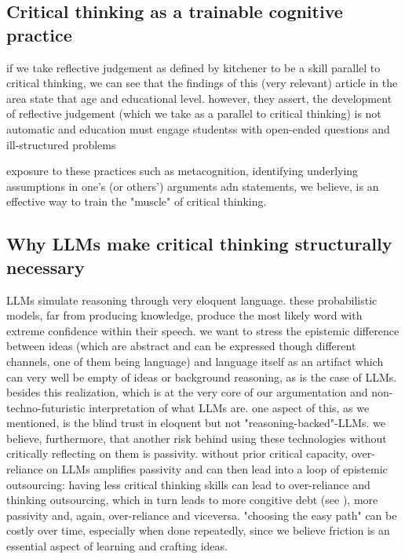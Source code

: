 \documentclass{article}
\begin{document}
\subsection{Critical thinking as a trainable cognitive practice}
if we take reflective judgement as defined by kitchener to be a skill parallel to critical thinking, we can see that  the findings of this (very relevant) article in the area state that age and educational level. however, they assert, the development of reflective judgement (which we take as a parallel to critical thinking) is not automatic and education must engage studentss with open-ended questions and ill-structured problems \cite{KITCHENER198189}

exposure to these practices such as metacognition, identifying underlying assumptions in one's (or others') arguments adn statements, we believe, is an effective way to train the "muscle" of critical thinking.


\subsection{Why LLMs make critical thinking structurally necessary}
LLMs simulate reasoning through very eloquent language. these probabilistic models, far from producing knowledge, produce the most likely word with extreme confidence within their speech. we want to stress the epistemic difference between ideas (which are abstract and can be expressed though different channels, one of them being language) and language itself as an artifact which can very well be empty of ideas or background reasoning, as is the case of LLMs. besides this realization, which is at the very core of our argumentation and non-techno-futuristic interpretation of what LLMs are.
one aspect of this, as we mentioned, is the blind trust in eloquent but not "reasoning-backed"-LLMs. we believe, furthermore, that another risk behind using these technologies without critically reflecting on them is passivity. without prior critical capacity, over-reliance on LLMs amplifies passivity and can then lead into a loop of epistemic outsourcing: having less critical thinking skills can lead to over-reliance and thinking outsourcing, which in turn leads to more congitive debt (see \cite{kosmyna2025brainchatgptaccumulationcognitive}), more passivity and, again, over-reliance and viceversa. "choosing the easy path" can be costly over time, especially when done repeatedly, since we believe friction is an essential aspect of learning and crafting ideas.
\end{document}
